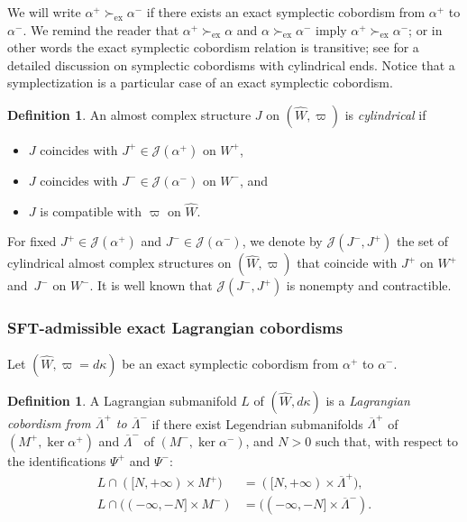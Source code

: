 \documentclass[10pt]{amsart}
\let\mathcal\mathscr
\newcommand{\exact}{\mathrm{ex}}
\theoremstyle{plain}
\theoremstyle{definition}
\newtheorem{defn}[thm]{Definition}
\numberwithin{equation}{subsection}
\begin{document}
We will write $ \alpha^+ \succ_{\exact} \alpha^-$ if there exists an exact symplectic cobordism from $ \alpha^+$ to $ \alpha^-$. We remind the reader that $\alpha^+ \succ_{\exact} \alpha$ and $ \alpha \succ_{\exact} \alpha^-$ imply $ \alpha^+ \succ_{\exact} \alpha^-$; or in other words the exact symplectic cobordism relation is transitive; see \cite{CPT} for a detailed discussion on symplectic cobordisms with cylindrical ends. Notice that a symplectization is a particular case of an exact symplectic cobordism.

\begin{defn}
An almost complex structure $J$ on $(\widehat{W},\varpi)$ is {\em cylindrical} if
\begin{itemize}
\item $J$ coincides with $J^+ \in \mathcal{J}(\alpha^+)$ on $W^+$,
\item $J$ coincides with $J^- \in \mathcal{J}(\alpha^-)$ on $W^-$, and
\item $J$ is compatible with $\varpi$ on $\widehat{W}$.
\end{itemize}
\end{defn}

For fixed $J^+ \in \mathcal{J}(\alpha^+)$ and $J^- \in \mathcal{J}(\alpha^-)$, we denote by $\mathcal{J}(J^-,J^+)$ the set of cylindrical almost complex structures on $(\widehat{W},\varpi)$ that coincide with $J^+$ on $W^+$ and~$J^-$ on $W^-$. It is well known that $\mathcal{J}(J^-,J^+)$ is nonempty and contractible.

\subsubsection{SFT-admissible exact Lagrangian cobordisms}

Let $(\widehat W,\varpi=d\kappa)$ be an exact symplectic cobordism from $\alpha^+$ to $\alpha^-$.

\begin{defn}
A Lagrangian submanifold $L$ of $(\widehat W,d\kappa)$ is a {\em Lagrangian cobordism from $\overline{\Lambda}^+$ to $\overline{\Lambda}^-$} if there exist Legendrian submanifolds $\overline{\Lambda}^+$ of $(M^+,\ker \alpha^+)$ and $\overline{\Lambda}^-$ of $(M^-,\ker \alpha^-)$, and $N>0$ such that, with respect to the identifications $\Psi^+$ and $\Psi^-$:
\begin{align}
L \cap ([N,+\infty) \times M^+) &= ([N,+\infty) \times \overline{\Lambda}^+), \\
L \cap ((-\infty,-N] \times M^-)&= ((-\infty,-N] \times \overline{\Lambda}^-).
\end{align}
\end{defn}
\end{document}
